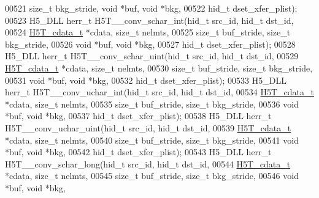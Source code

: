 \begin{DoxyCode}
00521                             \textcolor{keywordtype}{size\_t} bkg\_stride, \textcolor{keywordtype}{void} *buf, \textcolor{keywordtype}{void} *bkg,
00522                             hid\_t dset\_xfer\_plist);
00523 H5\_DLL herr\_t H5T\_\_conv\_schar\_int(hid\_t src\_id, hid\_t dst\_id,
00524                   \hyperlink{struct_h5_t__cdata__t}{H5T\_cdata\_t} *cdata, \textcolor{keywordtype}{size\_t} nelmts,
00525                   \textcolor{keywordtype}{size\_t} buf\_stride, \textcolor{keywordtype}{size\_t} bkg\_stride,
00526                                   \textcolor{keywordtype}{void} *buf, \textcolor{keywordtype}{void} *bkg,
00527                                   hid\_t dset\_xfer\_plist);
00528 H5\_DLL herr\_t H5T\_\_conv\_schar\_uint(hid\_t src\_id, hid\_t dst\_id,
00529                    \hyperlink{struct_h5_t__cdata__t}{H5T\_cdata\_t} *cdata, \textcolor{keywordtype}{size\_t} nelmts,
00530                    \textcolor{keywordtype}{size\_t} buf\_stride, \textcolor{keywordtype}{size\_t} bkg\_stride,
00531                                    \textcolor{keywordtype}{void} *buf, \textcolor{keywordtype}{void} *bkg,
00532                                    hid\_t dset\_xfer\_plist);
00533 H5\_DLL herr\_t H5T\_\_conv\_uchar\_int(hid\_t src\_id, hid\_t dst\_id,
00534                   \hyperlink{struct_h5_t__cdata__t}{H5T\_cdata\_t} *cdata, \textcolor{keywordtype}{size\_t} nelmts,
00535                   \textcolor{keywordtype}{size\_t} buf\_stride, \textcolor{keywordtype}{size\_t} bkg\_stride,
00536                                   \textcolor{keywordtype}{void} *buf, \textcolor{keywordtype}{void} *bkg,
00537                                   hid\_t dset\_xfer\_plist);
00538 H5\_DLL herr\_t H5T\_\_conv\_uchar\_uint(hid\_t src\_id, hid\_t dst\_id,
00539                    \hyperlink{struct_h5_t__cdata__t}{H5T\_cdata\_t} *cdata, \textcolor{keywordtype}{size\_t} nelmts,
00540                    \textcolor{keywordtype}{size\_t} buf\_stride, \textcolor{keywordtype}{size\_t} bkg\_stride,
00541                                    \textcolor{keywordtype}{void} *buf, \textcolor{keywordtype}{void} *bkg,
00542                                    hid\_t dset\_xfer\_plist);
00543 H5\_DLL herr\_t H5T\_\_conv\_schar\_long(hid\_t src\_id, hid\_t dst\_id,
00544                    \hyperlink{struct_h5_t__cdata__t}{H5T\_cdata\_t} *cdata, \textcolor{keywordtype}{size\_t} nelmts,
00545                    \textcolor{keywordtype}{size\_t} buf\_stride, \textcolor{keywordtype}{size\_t} bkg\_stride,
00546                                    \textcolor{keywordtype}{void} *buf, \textcolor{keywordtype}{void} *bkg,

\end{DoxyCode}
